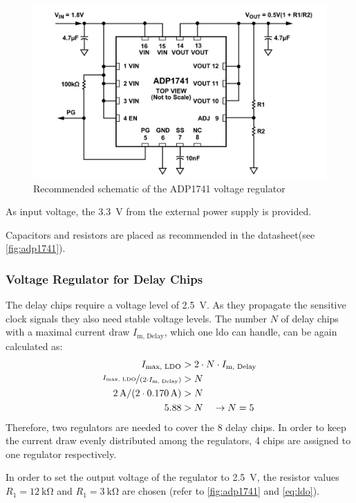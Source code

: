 \begin{figure}[tbh]
	\centering
	\includegraphics[width = \textwidth]{chap/04-theresa/img/schematic/adp1741_d}
	\caption{Recommended schematic of the ADP1741 voltage regulator \cite{adp1741}}
	\label{fig:adp1741}
\end{figure}

As input voltage, the \SI{3.3}{\volt} from the external power supply is provided. 

Capacitors and resistors are placed as recommended in the datasheet\cite{adp1741}(see \autoref{fig:adp1741}).

\subsubsection*{Voltage Regulator for Delay Chips}
The delay chips require a voltage level of \SI{2.5}{\volt}. As they propagate the sensitive clock signals they also need stable voltage levels. 
The number $N$ of delay chips with a maximal current draw $I_\text{m, Delay}$, which one \gls{ldo} can handle, can be again calculated as:
\begin{align*}
	I_\text{max, LDO} &> 2 \cdot N \cdot I_\text{m, Delay} \\
	\nicefrac{I_\text{max, LDO}}{(2 \cdot I_\text{m, Delay})} &> N \\
	\SI{2}{\ampere} / (2\cdot \SI{0.170}{\ampere}) &> N \\
	5.88 &> N \quad \rightarrow N = 5	
\end{align*}
Therefore, two regulators are needed to cover the 8 delay chips.
In order to keep the current draw evenly distributed among the regulators, 4 chips are assigned to one regulator respectively.

In order to set the output voltage of the regulator to \SI{2.5}{\volt}, the resistor values $R_1 = \SI{12}{\kilo \ohm}$ and $R_1 = \SI{3}{\kilo \ohm}$ are chosen (refer to \autoref{fig:adp1741} and \autoref{eq:ldo}).

